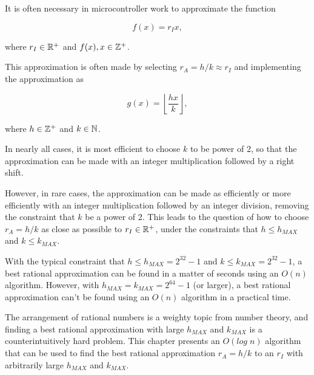 \chapter[\crlaonetitleemph{}]{\crlaonelongtitleemph{}}
\chaptermark{\crlaoneshorttitlenoemph{}}
\label{crla1}

It is often necessary in microcontroller work to approximate
the function

\begin{equation}
\label{eq:crla1:01}
f(x) = r_I x,
\end{equation}

\noindent{}where $r_I \in {\mathbb{R}^+}$ and $f(x), x \in {\mathbb{Z}^+}$.

This approximation is often made by selecting $r_A = h/k \approx r_I$ and implementing
the approximation as

\begin{equation}
\label{eq:crla1:02}
g(x) = \left\lfloor \frac{hx}{k} \right\rfloor ,
\end{equation}

\noindent{}where $h \in {\mathbb{Z}^+}$ and $k \in {\mathbb{N}}$.

In nearly all cases, it is most efficient to choose $k$ to be power of 2,
so that the approximation can be made with an integer multiplication
followed by a right shift.

However, in rare cases, the approximation can be made as efficiently or
more efficiently with an integer multiplication followed by an integer
division, removing the constraint that $k$ be a power of 2.  This leads to
the question of how to choose $r_A=h/k$ as close as possible to $r_I \in
{\mathbb{R}^+}$, under the constraints that $h \leq h_{MAX}$ and $k
\leq k_{MAX}$.

With the typical constraint that $h \leq h_{MAX} = 2^{32}-1$ and $k \leq
k_{MAX} = 2^{32}-1$, a best rational approximation can be found in a
matter of seconds using an $O(n)$ algorithm.  However, with $h_{MAX} =
k_{MAX} = 2^{64}-1$ (or larger), a best rational approximation can't be
found using an $O(n)$ algorithm in a practical time.

The arrangement of rational numbers is a weighty topic from number theory,
and finding a best rational approximation with large $h_{MAX}$ and
$k_{MAX}$ is a counterintuitively hard problem.  This chapter presents an
$O(log\;n)$ algorithm that can be used to find the best rational
approximation $r_A = h/k$ to an $r_I$ with arbitrarily large $h_{MAX}$ and
$k_{MAX}$.


